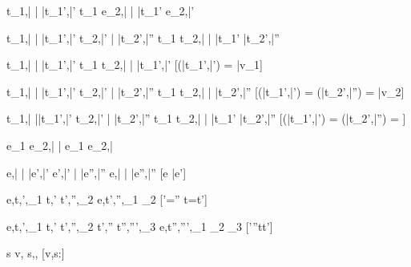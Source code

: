   {t_1,\bar{\sigma} \bar{\stride} \bar{t_1'},\bar{\sigma'}}
  {t_1 \Next e_2,\bar{\sigma} \bar{\stride} \bar{t_1'} \Next e_2,\bar{\sigma'}}


  {t_1,\bar{\sigma}  \bar{\stride} \bar{t_1'},\bar{\sigma'}  \Quad
   t_2,\bar{\sigma'} \bar{\stride} \bar{t_2'},\bar{\sigma''}}
  {t_1 \And t_2,\bar{\sigma} \bar{\stride} \bar{t_1'} \And \bar{t_2'},\bar{\sigma''}}


  {t_1,\bar{\sigma}  \bar{\stride} \bar{t_1'},\bar{\sigma'}}
  {t_1 \Or t_2,\bar{\sigma} \bar{\stride} \bar{t_1'},\bar{\sigma'}}
  [\Value(\bar{t_1'},\bar{\sigma'}) = \bar{v_1}]

  {t_1,\bar{\sigma}  \bar{\stride} \bar{t_1'},\bar{\sigma'}  \Quad
   t_2,\bar{\sigma'} \bar{\stride} \bar{t_2'},\bar{\sigma''}}
  {t_1 \Or t_2,\bar{\sigma} \bar{\stride} \bar{t_2'},\bar{\sigma''}}
  [\Value(\bar{t_1'},\bar{\sigma'}) = \bot \land \Value(\bar{t_2'},\bar{\sigma''}) = \bar{v_2}]

  {t_1,\bar{\sigma}  \bar{\stride }\bar{t_1'},\bar{\sigma'}  \Quad
   t_2,\bar{\sigma' }\bar{\stride} \bar{t_2'},\bar{\sigma''}}
  {t_1 \Or t_2,\bar{\sigma} \bar{\stride} \bar{t_1'} \Or \bar{t_2'},\bar{\sigma''}}
  [\Value(\bar{t_1'},\bar{\sigma'}) = \bot \land \Value(\bar{t_2'},\bar{\sigma''}) = \bot]


  { }
  {e_1 \Xor e_2,\bar{\sigma} \bar{\stride} e_1 \Xor e_2,\bar{\sigma}}

    {e,\bar{\sigma} \bar{\eval} \bar{e'},\bar{\sigma'}  \Quad
     e',\bar{\sigma'} \bar{\stride} \bar{e''},\bar{\sigma''}}
    {e,\bar{\sigma} \bar{\stride} \bar{e''},\bar{\sigma''}}
    [e \neq \bar{e'}]


    {e,\sigma \eval t,\sigma',\phi_1  \Quad
     t,\sigma' \stride t',\sigma'',\phi_2}
    {e,\sigma \normalise t',\sigma'',\phi_1 \land \phi_2}
    [\sigma'=\sigma'' \land t=t']

    {e,\sigma \eval t,\sigma',\phi_1  \Quad
     t,\sigma' \stride t',\sigma'',\phi_2  \Quad
     t',\sigma'' \normalise t'',\sigma''',\phi_3}
    {e,\sigma \normalise t'',\sigma''',\phi_1 \land \phi_2 \land \phi_3}
    [\sigma'\neq \sigma''\vee t\neq t']





  { s}
  {\Edit v,\sigma {} \Edit s,\sigma,\True}
  [v,s:\tau]

